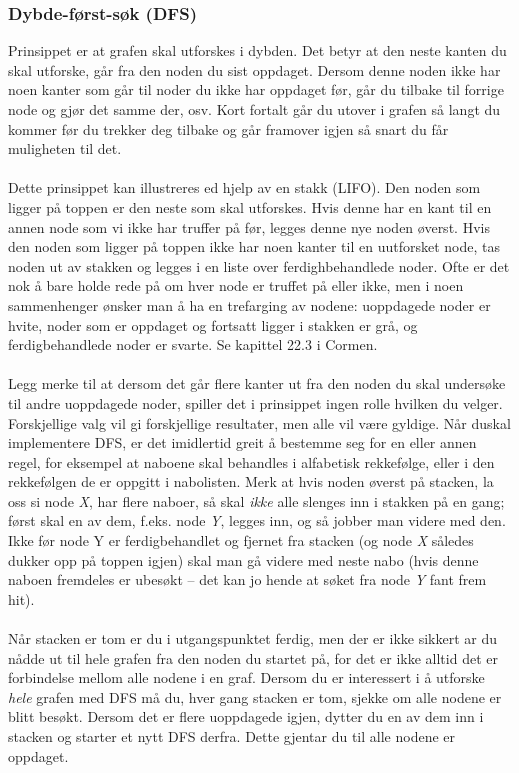 \subsubsection{Dybde-først-søk (DFS)}
Prinsippet er at grafen skal utforskes i dybden. Det betyr at den neste kanten du skal utforske, går fra den noden du sist oppdaget. Dersom denne noden ikke har noen kanter som går til noder du ikke har oppdaget før, går du tilbake til forrige node og gjør det samme der, osv. Kort fortalt går du utover i grafen så langt du kommer før du trekker deg tilbake og går framover igjen så snart du får muligheten til det.
\\\\
Dette prinsippet kan illustreres ed hjelp av en stakk (LIFO). Den noden som ligger på toppen er den neste som skal utforskes. Hvis denne har en kant til en annen node som vi ikke har truffer på før, legges denne nye noden øverst. Hvis den noden som ligger på toppen ikke har noen kanter til en uutforsket node, tas noden ut av stakken og legges i en liste over ferdighbehandlede noder. Ofte er det nok å bare holde rede på om hver node er truffet på eller ikke, men i noen sammenhenger ønsker man å ha en trefarging av nodene: uoppdagede noder er hvite, noder som er oppdaget og fortsatt ligger i stakken er grå, og ferdigbehandlede noder er svarte. Se kapittel 22.3 i Cormen.
\\\\
Legg merke til at dersom det går flere kanter ut fra den noden du skal undersøke til andre uoppdagede noder, spiller det i prinsippet ingen rolle hvilken du velger. Forskjellige valg vil gi forskjellige resultater, men alle vil være gyldige. Når duskal implementere DFS, er det imidlertid greit å bestemme seg for en eller annen regel, for eksempel at naboene skal behandles i alfabetisk rekkefølge, eller i den rekkefølgen de er oppgitt i nabolisten. Merk at hvis noden øverst på stacken, la oss si node \textit{X}, har flere naboer, så skal \textit{ikke} alle slenges inn i stakken på en gang; først skal en av dem, f.eks. node \textit{Y}, legges inn, og så jobber man videre med den. Ikke før node Y er ferdigbehandlet og fjernet fra stacken (og node \textit{X} således dukker opp på toppen igjen) skal man gå videre med neste nabo (hvis denne naboen fremdeles er ubesøkt – det kan jo hende at søket fra node \textit{Y} fant frem hit).
\\\\
Når stacken er tom er du i utgangspunktet ferdig, men der er ikke sikkert ar du nådde ut til hele grafen fra den noden du startet på, for det er ikke alltid det er forbindelse mellom alle nodene i en graf. Dersom du er interessert i å utforske \textit{hele} grafen med DFS må du, hver gang stacken er tom, sjekke om alle nodene er blitt besøkt. Dersom det er flere uoppdagede igjen, dytter du en av dem inn i stacken og starter et nytt DFS derfra. Dette gjentar du til alle nodene er oppdaget.

